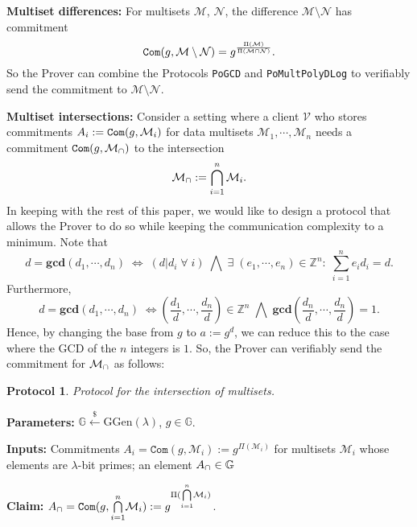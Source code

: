 \documentclass[11pt, lettersize, notitlepage, leqno, footskip=0.6cm]{article}
\newcommand{\bz}{\mathbb Z}
\newcommand{\slim}{\sum\limits}
\newcommand{\ttt}{\texttt}
\newcommand{\LRA}{\Longleftrightarrow}
\newcommand{\mc}{\mathcal}
\newcommand{\mb}{\mathbb}
\newcommand{\mbf}{\mathbf}
\newcommand{\mr}{\mathrm}
\newcommand{\sm}{\setminus}
\newcommand{\lam}{\lambda}
\newcommand{\lamb}{\lambda}
\newcommand{\mcM}{\mc{M}}
\newcommand{\vs}{\vspace{-0.15cm}}
\newcommand{\noin}{\noindent}
\newcommand{\GCD}{\mbf{gcd}}
\newtheorem{Prot}[Thm]{Protocol}
\numberwithin{equation}{section}
\begin{document}
\bigskip

\noin \textbf{Multiset differences:} For multisets $\mc{M}$, $\mc{N}$, the difference $\mc{M}\sm \mc{N} $ has commitment \vs $$\protect{\verb|Com|}(g, \mc{M}\sm \mc{N}) = g^{\frac{\Pi(\mcM)}{\Pi(\mcM\cap \mc{N})}} .$$ So the Prover can combine the Protocols \verb|PoGCD| and \verb|PoMultPolyDLog| to verifiably send the commitment to $\mc{M}\sm \mc{N} $. 

\bigskip

\noin \textbf{Multiset intersections:} Consider a setting where a client $\mc{V}$ who stores commitments $A_i:= \protect{\ttt{Com}}(g, \mc{M}_i)$ for data multisets $\mc{M}_1, \cdots, \mc{M}_n$ needs a commitment $\protect{\verb|Com|}(g, \mc{M}_{\tt{\cap}})$ to the intersection \vs $$\mc{M}_{\tt{\cap}}:=\bigcap\limits_{i=1}^n \mc{M}_i .$$ In keeping with the rest of this paper, we would like to design a protocol that allows the Prover to do so while keeping the communication complexity to a minimum. Note that \vs $$d = \GCD(d_1,\cdots,d_n)\; \LRA\; (d|d_i\;\forall\;i)\;\bigwedge\; \exists\;(e_1,\cdots,e_n)\in\bz^n:\;\slim_{i=1}^n e_id_i = d .$$\vs Furthermore, \vs $$d = \GCD(d_1,\cdots,d_n)\; \LRA \left(\frac{d_1}{d},\cdots, \frac{d_n}{d}\right)\in \bz^n\;\bigwedge\; \GCD\left(\frac{d_n}{d},\cdots, \frac{d_n}{d}\right)=1.$$ Hence, by changing the base from $g$ to $a:= g^d$, we can reduce this to the case where the GCD of the $n$ integers is $1$. So, the Prover can verifiably send the commitment for $\mc{M}_{\tt{\cap}}$ as follows: \vspace{0.2cm}


\begin{Prot} Protocol for the intersection of multisets.\end{Prot} \vspace{-0.3cm}

\noin \textbf{Parameters:} $\mb{G}\xleftarrow{\$} \mr{GGen}(\lamb)$,\; $g\in \mb{G}$.

\noin \textbf{Inputs:} Commitments $A_i = \ttt{Com}(g, \mcM_i) := g^{\Pi(\mc{M}_i)}$ for multisets $\mc{M}_i$ whose elements are $\lam$-bit primes; an element $A_{\tt{\cap}}\in\mb{G}$

\noin \textbf{Claim:} $A_{\tt{\cap}} = \protect{\verb|Com|}(g, {\bigcap\limits_{i=1}^n} \mc{M}_i) := g^{\Pi({\bigcap\limits_{i=1}^n} \mc{M}_i)}$.
\end{document}
